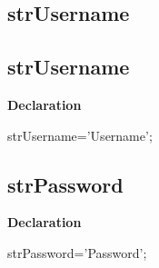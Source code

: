 \documentclass{report}
\newif\ifpdf
\begin{document}
\subsection*{\large{\textbf{strUsername}}\normalsize\hspace{1ex}\hrulefill}
\else
\subsection*{strUsername}
\fi
\label{trstrings-strUsername}
\begin{list}{}{
\setlength{\itemindent}{0cm}
\setlength{\listparindent}{0cm}
\setlength{\leftmargin}{\evensidemargin}
\addtolength{\leftmargin}{\tmplength}
\settowidth{\labelsep}{X}
\addtolength{\leftmargin}{\labelsep}
\setlength{\labelwidth}{\tmplength}
}
\item[\textbf{Declaration}\hfill]
\ifpdf
\begin{flushleft}
\fi
\begin{ttfamily}
strUsername='Username';\end{ttfamily}

\ifpdf
\end{flushleft}
\fi

\end{list}
\ifpdf
\subsection*{\large{\textbf{strPassword}}\normalsize\hspace{1ex}\hrulefill}
\else
\subsection*{strPassword}
\fi
\label{trstrings-strPassword}
\begin{list}{}{
\setlength{\itemindent}{0cm}
\setlength{\listparindent}{0cm}
\setlength{\leftmargin}{\evensidemargin}
\addtolength{\leftmargin}{\tmplength}
\settowidth{\labelsep}{X}
\addtolength{\leftmargin}{\labelsep}
\setlength{\labelwidth}{\tmplength}
}
\item[\textbf{Declaration}\hfill]
\ifpdf
\begin{flushleft}
\fi
\begin{ttfamily}
strPassword='Password';\end{ttfamily}

\ifpdf
\end{flushleft}
\fi

\end{list}
\ifpdf
\end{document}
